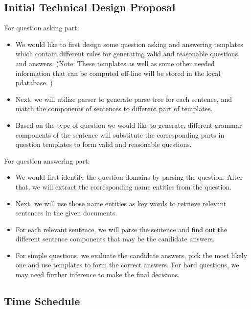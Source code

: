 \documentclass[a4page]{article}
\begin{document}
\subsection{Initial Technical Design Proposal}
For question asking part:
\begin{itemize}
\item We would like to first design some question asking and answering templates which contain different rules for generating valid and reasonable questions and answers. (Note: These templates as well as some other needed information that can be computed off-line will be stored in the local pdatabase. )
\item Next, we will utilize parser to generate parse tree for each sentence, and match the components of sentences to different part of templates.
\item Based on the type of question we would like to generate, different grammar components of the sentence will substitute the corresponding parts in question templates to form valid and reasonable questions.
\end{itemize}
For question answering part:
\begin{itemize}
\item We would first identify the question domains by parsing the question. After that, we will extract the corresponding name entities from the question.
\item Next, we will use those name entities as key words to retrieve relevant sentences in the given documents.
\item For each relevant sentence, we will parse the sentence and find out the different sentence components that may be the candidate answers.
\item For simple questions, we evaluate the candidate answers, pick the most likely one and use templates to form the correct answers. For hard questions, we may need further inference to make the final decisions.
\end{itemize}


\subsection{Time Schedule}
\end{document}
